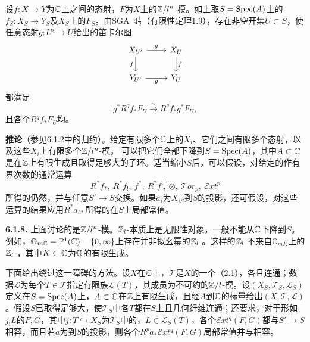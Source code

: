 设$f:X\to Y$为$\mathbb C$上之间的态射，$F$为$X$上的$\mathbb Z/l^n$-模。如上取$S=\operatorname{Spec}(A)$上的$f_S:X_S\to Y_S$及$X_S$上的$F_S$。由SGA~$4\frac12$（有限性定理1.9），存在非空开集$U\subset S$，使任意态射$g:U'\to U$给出的笛卡尔图
\[
\begin{tikzcd}[ampersand replacement=\&]
X_{U'}\arrow[r,"{g}"]\arrow[d,"{f}"']\&X_U\arrow[d,"{f}"]\\
Y_{U'}\arrow[r,"{g}"']\&Y_U
\end{tikzcd}
\]
都满足
\[
g^*R^qf_*F_U\xrightarrow{\sim}R^qf_*g^*F_U,
\]
且各个$R^qf_*F_U$均。

\noindent\textbf{推论}（参见6.1.2中的归约）。给定有限多个$\mathbb C$上的$X_i$、它们之间有限多个态射，以及这些$X_i$上有限多个$\mathbb Z/l^n$-模，
可以把它们全部下降到$S=\operatorname{Spec}(A)$，其中$A\subset\mathbb C$是在$\mathbb Z$上有限生成且取得足够大的子环。适当缩小$S$后，可以假设，对给定的作有界次数的通常运算
\[
R^*f_*,\ R^*f_!,\ f^*,\ R^*f^!,\ \otimes,\ \mathcal Tor_p,\ \mathcal Ext^p
\]
所得的仍然，并与任意$S'\to S$交换。如果$a_i$为$X_{iS}$到$S$的投影，还可假设，对这些运算的结果应用$R^*a_{i*}$所得的在$S$上局部常值。

\par\medskip\noindent\textbf{6.1.8.} 上面讨论的是$\mathbb Z/l^n$-模。$\mathbb Z_l$-本质上是无限性对象，一般不能从$\mathbb C$下降到$S$。例如，$\mathbb G_{m\mathbb C}=\mathbb P^1(\mathbb C)-\{0,\infty\}$上存在并非拟幺幂的$\mathbb Z_l$-。这样的$\mathbb Z_l$-不来自$\mathbb G_{mK}$上的$\mathbb Z_l$-，其中$K\subset\mathbb C$为$\mathbb Q$的有限生成。

下面给出绕过这一障碍的方法。设$X$在$\mathbb C$上，$\mathcal T$是$X$的一个（2.1），各且连通；数据$\mathcal L$为每个$T\in\mathcal T$指定有限族$\mathcal L(T)$，其成员为不可约的$\mathbb Z/l$-模。设$(X_S,\mathcal T_S,\mathcal L_S)$定义在$S=\operatorname{Spec}(A)$上，$A\subset\mathbb C$在$\mathbb Z$上有限生成，且经$A$到$\mathbb C$的标量给出$(X,\mathcal T,\mathcal L)$。假设$S$已取得足够大，使$\mathcal T_S$中各$T$都在$S$上且几何纤维连通；还要求，对于形如$j_!L$的$F,G$，其中$j:T\hookrightarrow X_S$为$\mathcal T_S$中的，$L\in\mathcal L_S(T)$，各个$\mathcal Ext^q(F,G)$都与$S'\to S$相容，而且若$a$为到$S$的投影，则各个$R^pa_*\mathcal Ext^q(F,G)$局部常值并与相容。

